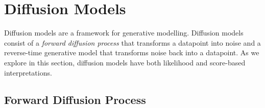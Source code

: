 \documentclass[ oneside,%
                    author={George Herbert},
                    degree={MSci},
                     title={Diffusion Models for Time-Evolving Precipitation Fields},
                  subtitle={}]{dissertation}
\begin{document}
\section{Diffusion Models}
\label{sec:background_diffusion}

Diffusion models \cite{Deep_Unsupervised_Learning_Sohl-Dickstein, DDPM_Ho, Score_Based_Song} are a framework for generative modelling. Diffusion models consist of a \textit{forward diffusion process} that transforms a datapoint into noise and a reverse-time generative model that transforms noise back into a datapoint. As we explore in this section, diffusion models have both likelihood and score-based interpretations.

\subsection{Forward Diffusion Process}
\label{sec:background_diffusion_forward}
\end{document}
